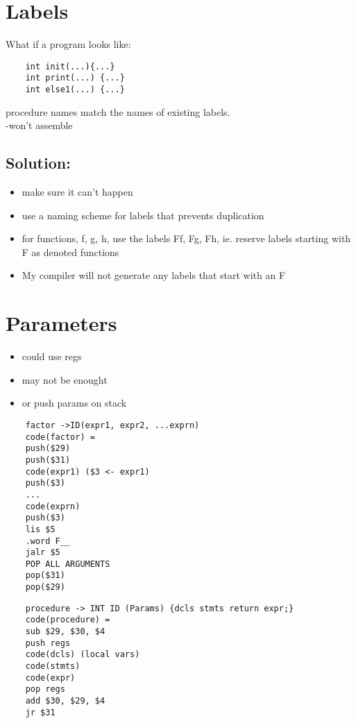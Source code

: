 \documentclass[12pt]{article}
\begin{document}
	\section*{Labels}
	What if a program looks like:\\
	\begin{verbatim}
	int init(...){...}
	int print(...) {...}
	int else1(...) {...}
	\end{verbatim}
	
	procedure names match the names of existing labels.\\
	-won't assemble\\
	
	\subsection*{Solution:}
	\begin{itemize}
		\item make sure it can't happen
		\item use a naming scheme for labels that prevents duplication
		\item for functions, f, g, h, use the labels Ff, Fg, Fh, ie. reserve labels starting with F as denoted functions
		\item My compiler will not generate any labels that start with an F
	\end{itemize}
	
	\section*{Parameters}
	\begin{itemize}
		\item could use regs
		\item may not be enought
		\item or push params on stack
	\end{itemize}
	
	\begin{verbatim}
	factor ->ID(expr1, expr2, ...exprn)
	code(factor) = 
	push($29)
	push($31)
	code(expr1) ($3 <- expr1)
	push($3)
	...
	code(exprn)
	push($3)
	lis $5
	.word F__
	jalr $5
	POP ALL ARGUMENTS
	pop($31)
	pop($29)
	\end{verbatim}
	
	\begin{verbatim}
	procedure -> INT ID (Params) {dcls stmts return expr;}
	code(procedure) = 
	sub $29, $30, $4
	push regs
	code(dcls) (local vars)
	code(stmts)
	code(expr)
	pop regs
	add $30, $29, $4
	jr $31
	\end{verbatim}
	
\end{document}
